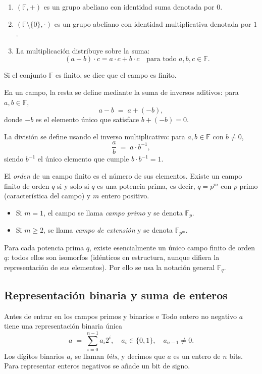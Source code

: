 \begin{enumerate}
  \item $(\mathbb{F},+)$ es un grupo abeliano con identidad suma denotada por $0$.
  \item $(\mathbb{F}\setminus\{0\},\cdot)$ es un grupo abeliano con identidad multiplicativa denotada por $1$.
  \item La multiplicación distribuye sobre la suma:
    \[
      (a + b)\cdot c = a\cdot c + b\cdot c
      \quad\text{para todo }a,b,c\in\mathbb{F}.
    \]
\end{enumerate}

Si el conjunto \(\mathbb{F}\) es finito, se dice que el campo es finito.  

En un campo, la resta se define mediante la suma de inversos aditivos: para \(a,b\in\mathbb{F}\),  
\[
  a - b \;=\; a + (-b),
\]
donde \(-b\) es el elemento único que satisface \(b + (-b) = 0\).  

La división se define usando el inverso multiplicativo: para \(a,b\in\mathbb{F}\) con \(b\neq0\),
\[
  \frac{a}{b} \;=\; a \cdot b^{-1},
\]
siendo \(b^{-1}\) el único elemento que cumple \(b\cdot b^{-1}=1\).  

El \emph{orden} de un campo finito es el número de sus elementos. Existe un campo finito de orden \(q\) si y solo si \(q\) es una potencia prima, es decir, \(q = p^m\) con \(p\) primo (característica del campo) y \(m\) entero positivo.  

\begin{itemize}
  \item Si \(m=1\), el campo se llama \emph{campo primo} y se denota \(\mathbb{F}_p\).  
  \item Si \(m\ge2\), se llama \emph{campo de extensión} y se denota \(\mathbb{F}_{p^m}\).  
\end{itemize}

Para cada potencia prima \(q\), existe esencialmente un único campo finito de orden \(q\): todos ellos son isomorfos (idénticos en estructura, aunque difiera la representación de sus elementos). Por ello se usa la notación general \(\mathbb{F}_q\).  

\subsection{Representación binaria y suma de enteros}
Antes de entrar en los campos primos y binarios e
Todo entero no negativo \(a\) tiene una representación binaria única
\[
  a \;=\;\sum_{i=0}^{n-1} a_i 2^i,
  \quad a_i\in\{0,1\},\quad a_{n-1}\neq0.
\]
Los dígitos binarios \(a_i\) se llaman \emph{bits}, y decimos que \(a\) es un entero de \(n\) bits. Para representar enteros negativos se añade un bit de signo.

